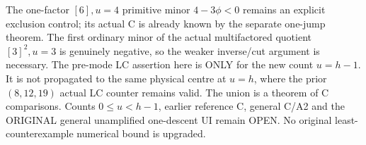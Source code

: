 The one-factor $[6],u=4$ primitive minor $4-3\phi<0$ remains an
explicit exclusion control; its actual C is already known by the
separate one-jump theorem. The first ordinary minor of the actual
multifactored quotient $[3]^2,u=3$ is genuinely negative, so the
weaker inverse/cut argument is necessary. The pre-mode LC assertion
here is ONLY for the new count $u=h-1$. It is not propagated to the
same physical centre at $u=h$, where the prior $(8,12,19)$ actual
LC counter remains valid. The union is a theorem of C comparisons.
Counts $0\le u<h-1$, earlier reference C, general C/A2 and the
ORIGINAL general unamplified one-descent UI remain OPEN. No original
least-counterexample numerical bound is upgraded.
